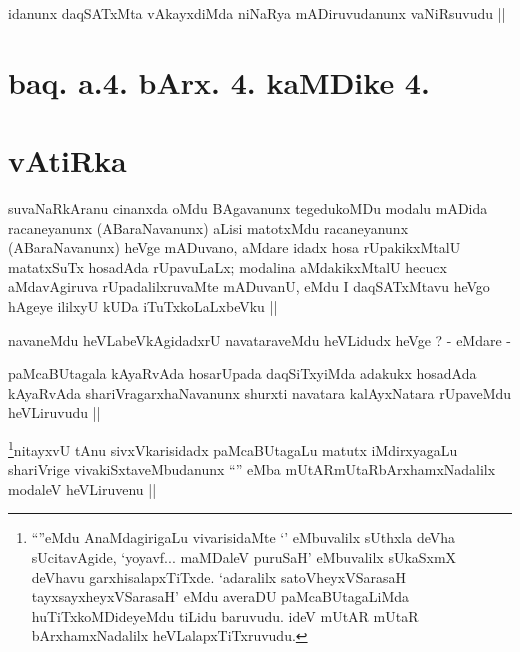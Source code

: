 
\begin{artha}
idanunx daqSATxMta vAkayxdiMda niNaRya mADiruvudanunx vaNiRsuvudu ||
\end{artha}

\section*{baq. a.4. bArx. 4. kaMDike 4.}

\stext

\section*{vAtiRka}

\begin{artha}
suvaNaRkAranu cinanxda oMdu BAgavanunx tegedukoMDu modalu mADida
racaneyanunx (ABaraNavanunx) aLisi matotxMdu racaneyanunx
(ABaraNavanunx) heVge mADuvano, aMdare idadx hosa rUpakikxMtalU
matatxSuTx hosadAda rUpavuLaLx; modalina aMdakikxMtalU hecucx
aMdavAgiruva rUpadalilxruvaMte mADuvanU, eMdu I daqSATxMtavu heVgo
hAgeye ililxyU kUDa iTuTxkoLaLxbeVku ||
\end{artha}

\begin{artha}
navaneMdu heVLabeVkAgidadxrU navataraveMdu heVLidudx heVge ? - eMdare -
\end{artha}

\begin{artha}
paMcaBUtagala kAyaRvAda hosarUpada daqSiTxyiMda adakukx hosadAda
kAyaRvAda shariVragarxhaNavanunx shurxti navatara kalAyxNatara
rUpaveMdu heVLiruvudu || 
\end{artha}


\begin{artha}
\footnote{``\stext''eMdu AnaMdagirigaLu vivarisidaMte `\stext'
  eMbuvalilx sUthxla deVha sUcitavAgide, `yo\s yavf... maMDaleV
  puruSaH' eMbuvalilx sUkaSxmX deVhavu garxhisalapxTiTxde. `adaralilx
  satoVheyxVSarasaH tayxsayxheyxVSarasaH' eMdu averaDU
  paMcaBUtagaLiMda huTiTxkoMDideyeMdu tiLidu baruvudu. ideV mUtAR
  mUtaR bArxhamxNadalilx heVLalapxTiTxruvudu.}nitayxvU tAnu sivxVkarisidadx paMcaBUtagaLu matutx iMdirxyagaLu
shariVrige vivakiSxtaveMbudanunx ``\stext'' eMba
mUtARmUtaRbArxhamxNadalilx modaleV heVLiruvenu ||
\end{artha}

